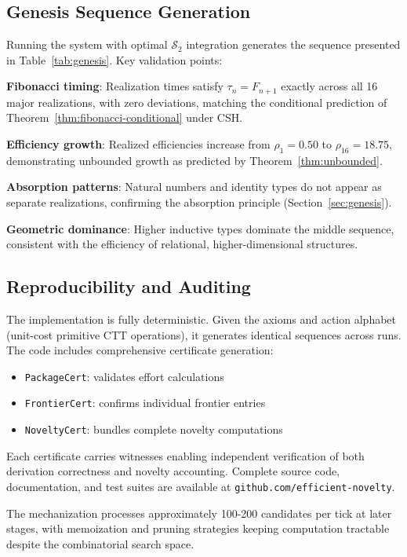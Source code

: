 \documentclass[11pt]{article}
\theoremstyle{definition}
\theoremstyle{plain}
\theoremstyle{remark}
\begin{document}
\subsection{Genesis Sequence Generation}

Running the system with optimal $\mathcal{S}_2$ integration generates the sequence presented in Table~\ref{tab:genesis}. Key validation points:

\textbf{Fibonacci timing}: Realization times satisfy $\tau_n = F_{n+1}$ exactly across all 16 major realizations, with zero deviations, matching the conditional prediction of Theorem~\ref{thm:fibonacci-conditional} under CSH.

\textbf{Efficiency growth}: Realized efficiencies increase from $\rho_1 = 0.50$ to $\rho_{16} = 18.75$, demonstrating unbounded growth as predicted by Theorem~\ref{thm:unbounded}.

\textbf{Absorption patterns}: Natural numbers and identity types do not appear as separate realizations, confirming the absorption principle (Section~\ref{sec:genesis}).

\textbf{Geometric dominance}: Higher inductive types dominate the middle sequence, consistent with the efficiency of relational, higher-dimensional structures.

\subsection{Reproducibility and Auditing}

The implementation is fully deterministic. Given the axioms and action alphabet (unit-cost primitive CTT operations), it generates identical sequences across runs. The code includes comprehensive certificate generation:
\begin{itemize}
\item \texttt{PackageCert}: validates effort calculations
\item \texttt{FrontierCert}: confirms individual frontier entries
\item \texttt{NoveltyCert}: bundles complete novelty computations
\end{itemize}

Each certificate carries witnesses enabling independent verification of both derivation correctness and novelty accounting. Complete source code, documentation, and test suites are available at \texttt{github.com/efficient-novelty}.

The mechanization processes approximately 100-200 candidates per tick at later stages, with memoization and pruning strategies keeping computation tractable despite the combinatorial search space.
\end{document}
